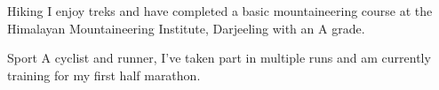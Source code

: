 \documentclass[11pt,a4paper,sans]{moderncv}        %
\begin{document}
\vspace{6pt}

\cvline
{\textcolor{light}{Hiking}}
{I enjoy treks and have completed a basic mountaineering course at the Himalayan Mountaineering Institute, Darjeeling with an A grade.}

\vspace{6pt}

\cvline
{\textcolor{light}{Sport}}
{A cyclist and runner, I've taken part in multiple runs and am currently training for my first half marathon.}

\vspace{6pt}

\nocite{*}



\end{document}

